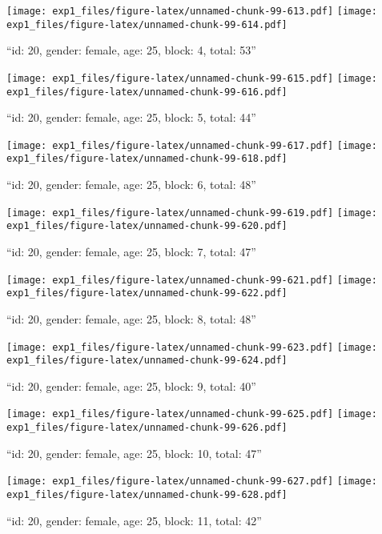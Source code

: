 \documentclass[,]{article}
\begin{document}
\texttt{[image: exp1\_files/figure-latex/unnamed-chunk-99-613.pdf]}
\texttt{[image: exp1\_files/figure-latex/unnamed-chunk-99-614.pdf]}

\newpage
[1] 

``id: 20, gender: female, age: 25, block: 4, total: 53''

\texttt{[image: exp1\_files/figure-latex/unnamed-chunk-99-615.pdf]}
\texttt{[image: exp1\_files/figure-latex/unnamed-chunk-99-616.pdf]}

\newpage
[1] 

``id: 20, gender: female, age: 25, block: 5, total: 44''

\texttt{[image: exp1\_files/figure-latex/unnamed-chunk-99-617.pdf]}
\texttt{[image: exp1\_files/figure-latex/unnamed-chunk-99-618.pdf]}

\newpage
[1] 

``id: 20, gender: female, age: 25, block: 6, total: 48''

\texttt{[image: exp1\_files/figure-latex/unnamed-chunk-99-619.pdf]}
\texttt{[image: exp1\_files/figure-latex/unnamed-chunk-99-620.pdf]}

\newpage
[1] 

``id: 20, gender: female, age: 25, block: 7, total: 47''

\texttt{[image: exp1\_files/figure-latex/unnamed-chunk-99-621.pdf]}
\texttt{[image: exp1\_files/figure-latex/unnamed-chunk-99-622.pdf]}

\newpage
[1] 

``id: 20, gender: female, age: 25, block: 8, total: 48''

\texttt{[image: exp1\_files/figure-latex/unnamed-chunk-99-623.pdf]}
\texttt{[image: exp1\_files/figure-latex/unnamed-chunk-99-624.pdf]}

\newpage
[1] 

``id: 20, gender: female, age: 25, block: 9, total: 40''

\texttt{[image: exp1\_files/figure-latex/unnamed-chunk-99-625.pdf]}
\texttt{[image: exp1\_files/figure-latex/unnamed-chunk-99-626.pdf]}

\newpage
[1] 

``id: 20, gender: female, age: 25, block: 10, total: 47''

\texttt{[image: exp1\_files/figure-latex/unnamed-chunk-99-627.pdf]}
\texttt{[image: exp1\_files/figure-latex/unnamed-chunk-99-628.pdf]}

\newpage
[1] 

``id: 20, gender: female, age: 25, block: 11, total: 42''
\end{document}
